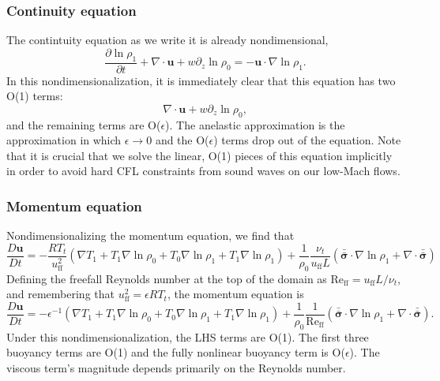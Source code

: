 \documentclass[aps, pre, onecolumn, nofootinbib, notitlepage, groupedaddress, amsfonts, amssymb, amsmath, longbibliography, superscriptaddress]{revtex4-1}
\newcommand{\grad}{\ensuremath{\nabla}}
\newcommand{\lilstressT}{\ensuremath{\bm{\bar{\bar{\sigma}}}}}
\begin{document}
\subsubsection{Continuity equation}
The contintuity equation as we write it is already nondimensional,
\begin{equation}
\frac{\partial \ln\rho_1}{\partial t} + \grad\cdot\bm{u} + w\partial_z \ln\rho_0 = -\bm{u}\cdot\grad\ln\rho_1.
\end{equation}
In this nondimensionalization, it is immediately clear that this equation has two O(1) terms:
$$
\grad\cdot\bm{u} + w\partial_z \ln\rho_0,
$$
and the remaining terms are O($\epsilon$).
The anelastic approximation is the approximation in which $\epsilon \rightarrow 0$ and the O($\epsilon$) terms drop out of the equation.
Note that it is crucial that we solve the linear, O(1) pieces of this equation implicitly in order to avoid hard CFL constraints from sound waves on our low-Mach flows.

\subsubsection{Momentum equation}
Nondimensionalizing the momentum equation, we find that
\begin{equation}
\frac{D \bm{u}}{D t} = -\frac{ R T_t }{u_{\text{ff}}^2}\left(\grad T_1 + T_1\grad\ln\rho_0 + T_0 \grad\ln\rho_1 + T_1\grad\ln\rho_1\right)
+ \frac{1}{\rho_0}\frac{\nu_t}{u_{\text{ff}} L} \left(\lilstressT\cdot\grad\ln\rho_1 + \grad\cdot\lilstressT\right)
\end{equation}
Defining the freefall Reynolds number at the top of the domain as $\text{Re}_{\text{ff}} = u_{\text{ff}} L / \nu_t$, and remembering that $u_{\text{ff}}^2 = \epsilon R T_t$, the momentum equation is
\begin{equation}
\frac{D \bm{u}}{D t} = -\epsilon^{-1}\left(\grad T_1 + T_1\grad\ln\rho_0 + T_0 \grad\ln\rho_1 + T_1\grad\ln\rho_1\right)
+ \frac{1}{\rho_0}\frac{1}{\text{Re}_{\text{ff}}} \left(\lilstressT\cdot\grad\ln\rho_1 + \grad\cdot\lilstressT\right).
\end{equation}
Under this nondimensionalization, the LHS terms are O(1).
The first three buoyancy terms are O(1) and the fully nonlinear buoyancy term is O($\epsilon$).
The viscous term's magnitude depends primarily on the Reynolds number.
\end{document}
